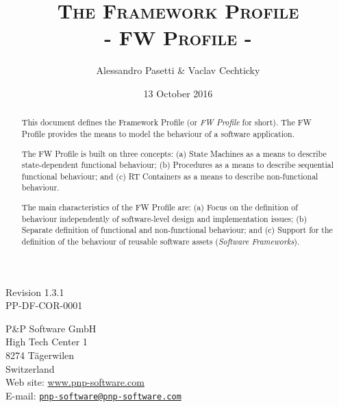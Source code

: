 \documentclass[a4paper,10pt]{article}
\title{\textsc{The Framework Profile} \\ \textsc{- FW Profile -}}
\author{Alessandro Pasetti \& Vaclav Cechticky}
\date{13 October 2016}
\begin{document}
\maketitle

\begin{center}
Revision 1.3.1 \\
PP-DF-COR-0001
\end{center}

\vspace{1cm}

\begin{center}
P\&P Software GmbH \\
High Tech Center 1 \\
8274 T\"{a}gerwilen \\
Switzerland \\
\vspace{2mm}
Web site: \url{www.pnp-software.com}\\
E-mail: \href{mailto:pnp-software@pnp-software.com}{\nolinkurl{pnp-software@pnp-software.com}} 
\end{center}

\vspace{1.2cm}

\begin{table}[ht]
\begin{center}
\begin{tabular}{p{11.7cm}}
\\
\hline
\end{tabular}
\end{center}
\end{table}
\begin{abstract}
This document defines the Framework Profile (or \textit{FW Profile} for short). 
The FW Profile provides the means to model the behaviour of a software application. 
\par
The FW Profile is built on three concepts: (a) State Machines as a means to describe state-dependent functional behaviour; 
(b) Procedures as a means to describe sequential functional behaviour; and (c) RT Containers as a means to describe non-functional behaviour.
\par
The main characteristics of the FW Profile are: (a) Focus on the definition of behaviour independently of software-level design and implementation issues; 
(b) Separate definition of functional and non-functional behaviour; and (c) Support for the definition of the behaviour of reusable software assets 
(\textit{Software Frameworks}).
\end{abstract}
\begin{table}[ht]
\begin{center}
\begin{tabular}{p{11.7cm}}
\\
\hline
\end{tabular}
\end{center}
\end{table}
\end{document}
